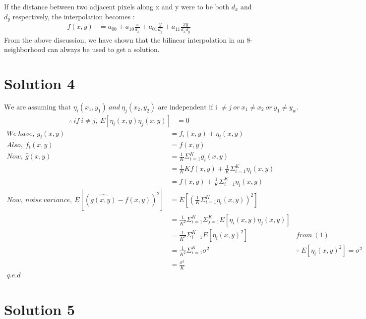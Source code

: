 \documentclass[a4paper,fleqn,11pt]{article}
\theoremstyle{mytheor}
\begin{document}
If the distance between two adjacent pixels along x and y were to be both $d_x$ and $d_y$ respectively, the interpolation becomes :
\begin{align}
f(x, y) & = a_{00} + a_{10}\frac{x}{d_x} + a_{01}\frac{y}{d_y} + a_{11}\frac{xy}{d_x d_y}
\end{align}
From the above discussion, we have shown that the bilinear interpolation in an 8-neighborhood can always be used to get a solution.
\section*{Solution 4}
$$\text{We are assuming that }\eta_i (x_1, y_1)\ and\ \eta_j (x_2, y_2)\text{ are independent if i }\neq j\ or\ x_1 \neq x_2\ or\ y_1 \neq y_w.$$
\begin{align}
\therefore\ if\ i \neq j,\ E[\eta_i(x, y)\eta_j(x, y)] & = 0
\end{align}
\begin{align*}
We\ have,\ g_i(x, y) & = f_i(x, y) + \eta_i(x, y) \\
Also,\ f_i(x, y) & = f(x, y) \\
Now,\ \hat{g}(x, y)& = \frac{1}{K} \Sigma_{i = 1}^K g_i(x, y) \\
& = \frac{1}{K}K f(x, y) + \frac{1}{K}\Sigma_{i = 1}^K \eta_i(x, y) \\
& = f(x, y) + \frac{1}{K}\Sigma_{i = 1}^K \eta_i(x, y) \\
Now,\ noise\ variance,\ E[(\hat{g(x, y)} - f(x, y))^2] & = E[(\frac{1}{K}\Sigma_{i = 1}^K \eta_i(x, y))^2] \\
& = \frac{1}{K^2}\Sigma_{i = 1}^K\Sigma_{j = 1}^K E[\eta_i(x, y)\eta_j(x, y)] \\
& = \frac{1}{K^2}\Sigma_{i = 1}^K E[\eta_i(x, y)^2] & from\ (1) \\
& = \frac{1}{K^2}\Sigma_{i = 1}^K \sigma^2 & \because\ E[\eta_i(x, y)^2] = \sigma^2 \\
& = \frac{\sigma^2}{K} \\
q.e.d
\end{align*}

\section*{Solution 5}
\end{document}
